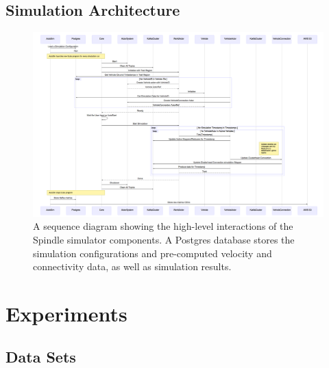 \documentclass{thesis}
\begin{document}
\section{Simulation Architecture}
    \begin{landscape}
        \begin{figure}
            \centering
            \includegraphics[scale=.3]{binImages/simulator-sequence.png}
            \caption{A sequence diagram showing the high-level interactions of
            the Spindle simulator components. A Postgres database stores the
            simulation configurations and pre-computed velocity and connectivity
            data, as well as simulation results.}
        \end{figure}
    \end{landscape}



\chapter{Experiments}
\section{Data Sets}
\end{document}
